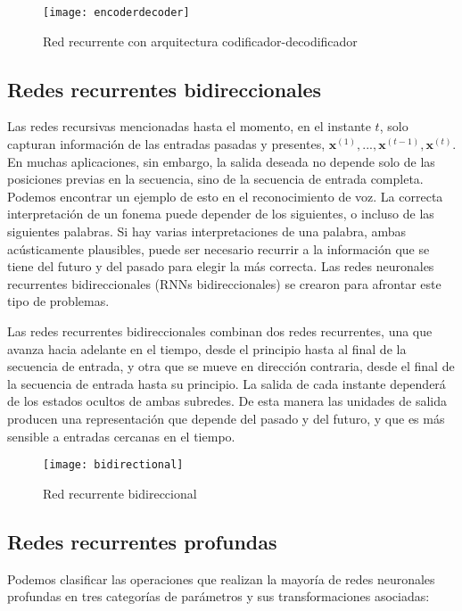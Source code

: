 \begin{figure}[htpb]
  \centering
  \texttt{[image: encoderdecoder]}
  \caption{Red recurrente con arquitectura codificador-decodificador}
  \label{fig:encoderdecoder}
\end{figure}


\subsection{Redes recurrentes bidireccionales}\label{rnn-bidirec}

Las redes recursivas mencionadas hasta el momento, en el instante $t$, solo capturan información de las entradas pasadas y presentes, $\textbf{x}^{(1)},...,\textbf{x}^{(t-1)},\textbf{x}^{(t)}$. En muchas aplicaciones, sin embargo, la salida deseada no depende solo de las posiciones previas en la secuencia, sino de la secuencia de entrada completa. Podemos encontrar un ejemplo de esto en el reconocimiento de voz. La correcta interpretación de un fonema puede depender de los siguientes, o incluso de las siguientes palabras. Si hay varias interpretaciones de una palabra, ambas acústicamente plausibles, puede ser necesario recurrir a la información que se tiene del futuro y del pasado para elegir la más correcta. Las redes neuronales recurrentes bidireccionales (RNNs bidireccionales) se crearon para afrontar este tipo de problemas.

Las redes recurrentes bidireccionales combinan dos redes recurrentes, una que avanza hacia adelante en el tiempo, desde el principio hasta al final de la secuencia de entrada, y otra que se mueve en dirección contraria, desde el final de la secuencia de entrada hasta su principio. La salida de cada instante dependerá de los estados ocultos de ambas subredes. De esta manera las unidades de salida producen una representación que depende del pasado y del futuro, y que es más sensible a entradas cercanas en el tiempo.

\begin{figure}[htpb]
  \centering
  \texttt{[image: bidirectional]}
  \caption{Red recurrente bidireccional}
  \label{fig:bidirectional}
\end{figure}

\subsection{Redes recurrentes profundas}\label{rnn-deep}

Podemos clasificar las operaciones que realizan la mayoría de redes neuronales profundas en tres categorías de parámetros y sus transformaciones asociadas:

